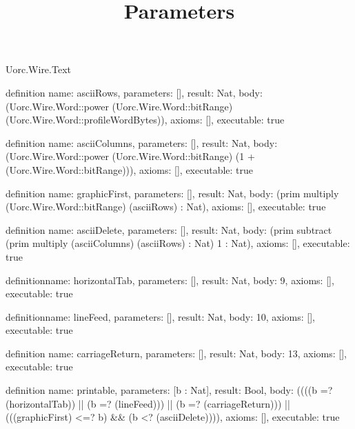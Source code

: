 \begin{lexlean}{Uorc.Wire.Text}
\title{Parameters}
\begin{semanticmodule}
definition{
  name: asciiRows,
  parameters: [],
  result: Nat,
  body: (Uorc.Wire.Word::power (Uorc.Wire.Word::bitRange) (Uorc.Wire.Word::profileWordBytes)),
  axioms: [],
  executable: true
}

definition{
  name: asciiColumns,
  parameters: [],
  result: Nat,
  body: (Uorc.Wire.Word::power (Uorc.Wire.Word::bitRange) (1 + (Uorc.Wire.Word::bitRange))),
  axioms: [],
  executable: true
}

definition{
  name: graphicFirst,
  parameters: [],
  result: Nat,
  body: (prim multiply (Uorc.Wire.Word::bitRange) (asciiRows) : Nat),
  axioms: [],
  executable: true
}

definition{
  name: asciiDelete,
  parameters: [],
  result: Nat,
  body: (prim subtract (prim multiply (asciiColumns) (asciiRows) : Nat) 1 : Nat),
  axioms: [],
  executable: true
}

definition{name: horizontalTab, parameters: [], result: Nat, body: 9, axioms: [], executable: true}

definition{name: lineFeed, parameters: [], result: Nat, body: 10, axioms: [], executable: true}

definition{
  name: carriageReturn,
  parameters: [],
  result: Nat,
  body: 13,
  axioms: [],
  executable: true
}

definition{
  name: printable,
  parameters: [b : Nat],
  result: Bool,
  body: ((((b =? (horizontalTab)) || (b =? (lineFeed))) || (b =? (carriageReturn))) || (((graphicFirst) <=? b) && (b <? (asciiDelete)))),
  axioms: [],
  executable: true
}
\end{semanticmodule}
\end{lexlean}
